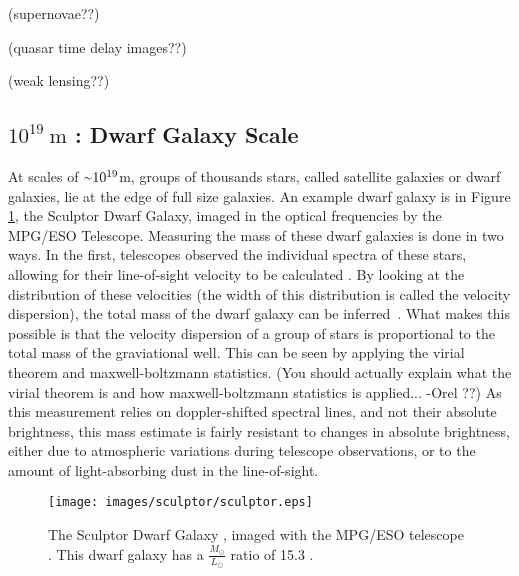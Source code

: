   {\color{red}(supernovae??)}

  {\color{red}(quasar time delay images??)}

  {\color{red}(weak lensing??)}
  
  \subsection{$10^{19}\:\text{m}$ : Dwarf Galaxy Scale}\label{dm_dwarfscale}
    At scales of $\nicetilde 10^{19}$m, groups of thousands stars, called satellite galaxies or dwarf galaxies, lie at the edge of full size galaxies.
    An example dwarf galaxy is in Figure \ref{fig:sculptor}, the Sculptor Dwarf Galaxy, imaged in the optical frequencies by the MPG/ESO Telescope.
    Measuring the mass of these dwarf galaxies is done in two ways.
    In the first, telescopes observed the individual spectra of these stars, allowing for their line-of-sight velocity to be calculated \cite{dwarf_gal_red_giant}.
    By looking at the distribution of these velocities (the width of this distribution is called the velocity dispersion), the total mass of the dwarf galaxy can be inferred~\cite{dwarf_gal_vel_dispersion, dwarf_gal_vel_dispersion2}.
    What makes this possible is that the velocity dispersion of a group of stars is proportional to the total mass of the graviational well.
    This can be seen by applying the virial theorem and maxwell-boltzmann statistics.
    {\color{red}(You should actually explain what the virial theorem is and how maxwell-boltzmann statistics is applied... -Orel ??)}
    As this measurement relies on doppler-shifted spectral lines, and not their absolute brightness, this mass estimate is fairly resistant to changes in absolute brightness, either due to atmospheric variations during telescope observations, or to the amount of light-absorbing dust in the line-of-sight.

    \begin{figure}[ht]
      \texttt{[image: images/sculptor/sculptor.eps]}
      \caption[Sculptor Dwarf Galaxy]{
        The Sculptor Dwarf Galaxy \cite{sculptor_image}, imaged with the MPG/ESO telescope \cite{sculptor_paper}.
        This dwarf galaxy has a $\frac{M_\odot}{L_\odot}$ ratio of 15.3 \cite{sculptor_ml}.
      }
      \label{fig:sculptor}
    \end{figure}
    
